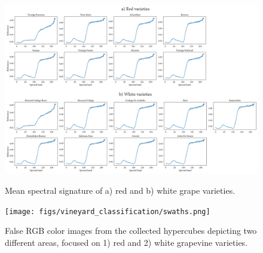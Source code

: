 \begin{figure}[bp]
    \centering
    {\includegraphics[width=\linewidth]{figs/vineyard_classification/vineyard_signature_grid.png}}
	\caption{Mean spectral signature of a) red and b) white grape varieties. }
	\label{fig:vineyard_mean_grid}
\end{figure}

\begin{figure}[bp]
    \centering
    {\texttt{[image: figs/vineyard\_classification/swaths.png]}}
	\caption{False RGB color images from the collected hypercubes depicting two different areas, focused on 1) red and 2) white grapevine varieties.}
	\label{fig:vineyard_swaths}
\end{figure}

